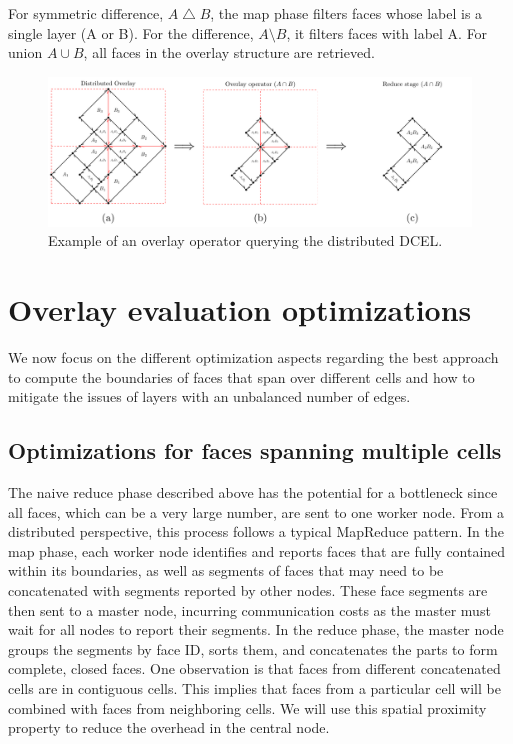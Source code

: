 For symmetric difference, $A \bigtriangleup B$, the map phase filters faces whose label is a single layer (A or B). For the difference, $A \setminus B$, it 
filters faces with label A. For union $A \cup B$, all faces in the overlay structure are retrieved. 

\begin{figure}
    \centering
    \includegraphics[width=\linewidth]{chapterSDCEL/overlay_operator.pdf}    
    \caption{Example of an overlay operator querying the distributed DCEL.} \label{fig:overlay_operator}
\end{figure}

\section{Overlay evaluation optimizations}\label{sec:alternative_methods}
We now focus on the different optimization aspects regarding the best approach to compute the boundaries of faces that span over different cells and how to mitigate the issues of layers with an unbalanced number of edges.

\subsection{Optimizations for faces spanning multiple cells}\label{sec:optimizing}

The naive reduce phase described above has the potential for a bottleneck since all faces, which can be a very large number, are sent to one worker node. From a distributed perspective, this process follows a typical MapReduce pattern. In the map phase, each worker node identifies and reports faces that are fully contained within its boundaries, as well as segments of faces that may need to be concatenated with segments reported by other nodes. These face segments are then sent to a master node, incurring communication costs as the master must wait for all nodes to report their segments. In the reduce phase, the master node groups the segments by face ID, sorts them, and concatenates the parts to form complete, closed faces.  One observation is that faces from different concatenated cells are in contiguous cells. This implies that faces from a particular cell will be combined with faces from neighboring cells. We will use this spatial proximity property to reduce the overhead in the central node.

